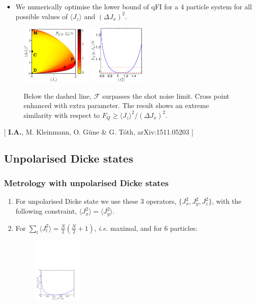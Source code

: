 \documentclass{beamer}
\newcommand{\expect}[1]{\ensuremath{\langle #1 \rangle}}
\newcommand{\varian}[1]{\ensuremath{\left(\Delta #1 \right)^2}}
\newcommand{\citate}[1]{{\footnotesize{\color{gray}[ #1 ]}}

	}
\begin{document}
		\begin{frame}
			\begin{itemize}
				\item We numerically optimise the lower bound of qFI for a 4 particle system for all possible values of $\expect{J_z}$ and $\varian{J_x}$.
			\end{itemize}
			\begin{figure}
				\includegraphics[height=110px]{img/lb-spsq.pdf}
				\hspace{15px}
				\includegraphics[height=110px]{img/4thparameter-spsq.pdf}
				\caption{Below the dashed line, $\mathcal{F}$ surpasses the shot noise limit. Cross point enhanced with extra parameter. The result shows an extreme similarity with respect to $F_Q\geq \expect{J_z}^2/\varian{J_x}$.}
			\end{figure}
			\vspace{-18px}
			\citate{\textbf{I.A.}, M. Kleinmann, O. G\"une \& G. T\'oth, arXiv:1511.05203}

		\end{frame}

	\subsection{Unpolarised Dicke states}

		\begin{frame}
			\frametitle{Metrology with unpolarised Dicke states}
			\begin{enumerate}
				\item<1-> For unpolarised Dicke state we use these 3 operators, $\{J_x^2,J_y^2,J_z^2\}$, with the following constraint, $\expect{J_x^2}=\expect{J_y^2}$.
				\item<2-> For $\sum_l \expect{J_l^2} = \tfrac{N}{2} (\tfrac{N}{2}+1)$, {\it i.e.} maximal, and for 6 particles:
				\begin{figure}
					\includegraphics[height=120px]{img/upperboundary-dicke.pdf}
				\end{figure}

			\end{enumerate}

		\end{frame}
\end{document}
